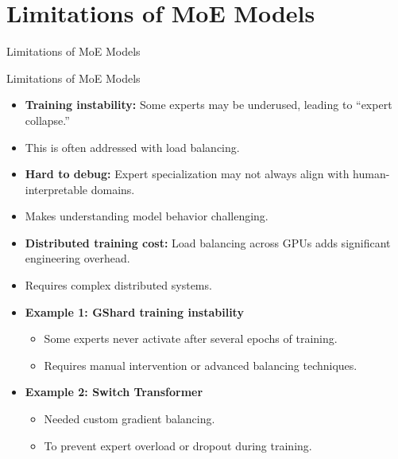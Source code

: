 \section{Limitations of MoE Models}
\begin{frame}[allowframebreaks]{}
    \LARGE Limitations of MoE Models
\end{frame}

\begin{frame}[allowframebreaks]{Limitations of MoE Models}
    \begin{itemize}
        \item \textbf{Training instability:} Some experts may be underused, leading to ``expert collapse.''
        \item This is often addressed with load balancing.
        \item \textbf{Hard to debug:} Expert specialization may not always align with human-interpretable domains.
        \item Makes understanding model behavior challenging.
        \item \textbf{Distributed training cost:} Load balancing across GPUs adds significant engineering overhead.
        \item Requires complex distributed systems.
    \framebreak
        \item \textbf{Example 1: GShard training instability}
        \begin{itemize}
            \item Some experts never activate after several epochs of training.
            \item Requires manual intervention or advanced balancing techniques.
        \end{itemize}
        \item \textbf{Example 2: Switch Transformer}
        \begin{itemize}
            \item Needed custom gradient balancing.
            \item To prevent expert overload or dropout during training.
        \end{itemize}
    \end{itemize}
\end{frame}
